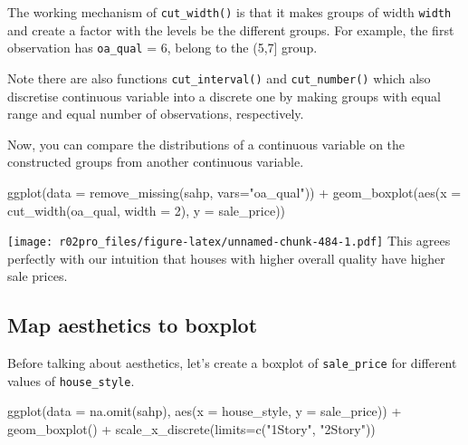 \documentclass[
]{book}
\newenvironment{Shaded}{\begin{snugshade}}{\end{snugshade}}
\newcommand{\AttributeTok}[1]{\textcolor[rgb]{0.77,0.63,0.00}{#1}}
\newcommand{\DecValTok}[1]{\textcolor[rgb]{0.00,0.00,0.81}{#1}}
\newcommand{\FunctionTok}[1]{\textcolor[rgb]{0.00,0.00,0.00}{#1}}
\newcommand{\NormalTok}[1]{#1}
\newcommand{\SpecialCharTok}[1]{\textcolor[rgb]{0.00,0.00,0.00}{#1}}
\newcommand{\StringTok}[1]{\textcolor[rgb]{0.31,0.60,0.02}{#1}}
\begin{document}
The working mechanism of \texttt{cut\_width()} is that it makes groups of width \texttt{width} and create a factor with the levels be the different groups. For example, the first observation has \texttt{oa\_qual} = 6, belong to the (5,7{]} group.

Note there are also functions \texttt{cut\_interval()} and \texttt{cut\_number()} which also discretise continuous variable into a discrete one by making groups with equal range and equal number of observations, respectively.

Now, you can compare the distributions of a continuous variable on the constructed groups from another continuous variable.

\begin{Shaded}
\begin{Highlighting}[]
\FunctionTok{ggplot}\NormalTok{(}\AttributeTok{data =} \FunctionTok{remove\_missing}\NormalTok{(sahp, }\AttributeTok{vars=}\StringTok{"oa\_qual"}\NormalTok{)) }\SpecialCharTok{+} \FunctionTok{geom\_boxplot}\NormalTok{(}\FunctionTok{aes}\NormalTok{(}\AttributeTok{x =} \FunctionTok{cut\_width}\NormalTok{(oa\_qual, }\AttributeTok{width =} \DecValTok{2}\NormalTok{), }\AttributeTok{y =}\NormalTok{ sale\_price))}
\end{Highlighting}
\end{Shaded}

\texttt{[image: r02pro\_files/figure-latex/unnamed-chunk-484-1.pdf]}
This agrees perfectly with our intuition that houses with higher overall quality have higher sale prices.

\hypertarget{map-aesthetics-to-boxplot}{%
\subsection{Map aesthetics to boxplot}\label{map-aesthetics-to-boxplot}}

Before talking about aesthetics, let's create a boxplot of \texttt{sale\_price} for different values of \texttt{house\_style}.

\begin{Shaded}
\begin{Highlighting}[]
\FunctionTok{ggplot}\NormalTok{(}\AttributeTok{data =} \FunctionTok{na.omit}\NormalTok{(sahp), }\FunctionTok{aes}\NormalTok{(}\AttributeTok{x =}\NormalTok{ house\_style, }\AttributeTok{y =}\NormalTok{ sale\_price)) }\SpecialCharTok{+} \FunctionTok{geom\_boxplot}\NormalTok{() }\SpecialCharTok{+} \FunctionTok{scale\_x\_discrete}\NormalTok{(}\AttributeTok{limits=}\FunctionTok{c}\NormalTok{(}\StringTok{"1Story"}\NormalTok{, }\StringTok{"2Story"}\NormalTok{))}
\end{Highlighting}
\end{Shaded}
\end{document}
